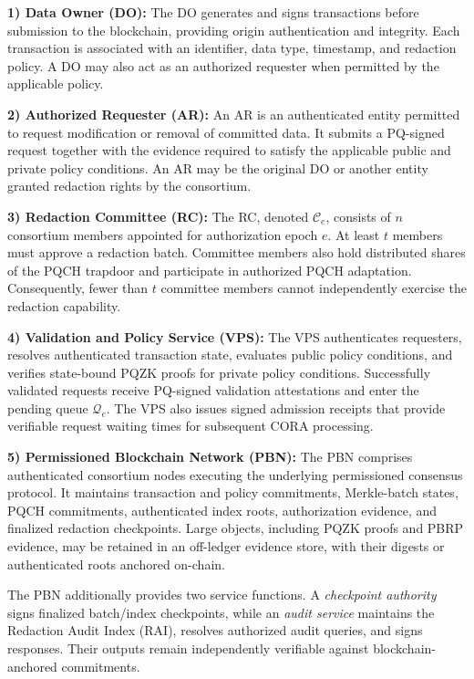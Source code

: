 \documentclass[lettersize,journal]{IEEEtran}
\begin{document}
\textbf{1) Data Owner (DO):}
The DO generates and signs transactions before submission to the
blockchain, providing origin authentication and integrity. Each
transaction is associated with an identifier, data type, timestamp, and
redaction policy. A DO may also act as an authorized requester when
permitted by the applicable policy.

\textbf{2) Authorized Requester (AR):}
An AR is an authenticated entity permitted to request modification or
removal of committed data. It submits a PQ-signed request together with
the evidence required to satisfy the applicable public and private
policy conditions. An AR may be the original DO or another entity
granted redaction rights by the consortium.

\textbf{3) Redaction Committee (RC):}
The RC, denoted $\mathcal{C}_e$, consists of $n$ consortium members
appointed for authorization epoch $e$. At least $t$ members must approve
a redaction batch. Committee members also hold distributed shares of
the PQCH trapdoor and participate in authorized PQCH adaptation.
Consequently, fewer than $t$ committee members cannot independently
exercise the redaction capability.

\textbf{4) Validation and Policy Service (VPS):}
The VPS authenticates requesters, resolves authenticated transaction
state, evaluates public policy conditions, and verifies state-bound
PQZK proofs for private policy conditions. Successfully validated
requests receive PQ-signed validation attestations and enter the
pending queue $\mathcal{Q}_e$. The VPS also issues signed admission
receipts that provide verifiable request waiting times for subsequent
CORA processing.

\textbf{5) Permissioned Blockchain Network (PBN):}
The PBN comprises authenticated consortium nodes executing the
underlying permissioned consensus protocol. It maintains transaction
and policy commitments, Merkle-batch states, PQCH commitments,
authenticated index roots, authorization evidence, and finalized
redaction checkpoints. Large objects, including PQZK proofs and PBRP
evidence, may be retained in an off-ledger evidence store, with their
digests or authenticated roots anchored on-chain.

The PBN additionally provides two service functions. A
\emph{checkpoint authority} signs finalized batch/index checkpoints,
while an \emph{audit service} maintains the Redaction Audit Index (RAI),
resolves authorized audit queries, and signs responses. Their outputs
remain independently verifiable against blockchain-anchored
commitments.
\end{document}
